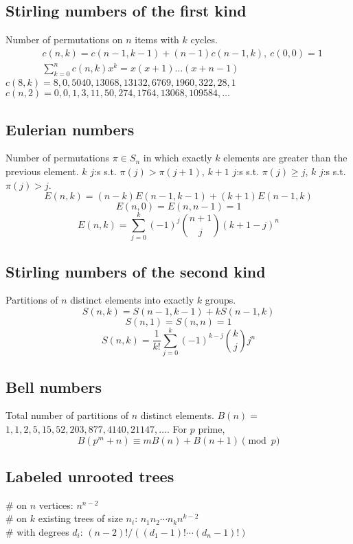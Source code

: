 \subsection{Stirling numbers of the first kind}
Number of permutations on $n$ items with $k$ cycles.
\begin{align*}
    & c(n,k) = c(n-1,k-1) + (n-1) c(n-1,k),\ c(0,0) = 1        \\
    & \textstyle \sum_{k=0}^n c(n,k)x^k = x(x+1) \dots (x+n-1)
\end{align*}
$c(8,k) = 8, 0, 5040, 13068, 13132, 6769, 1960, 322, 28, 1$ \\
$c(n,2) = 0, 0, 1, 3, 11, 50, 274, 1764, 13068, 109584, \dots$

\subsection{Eulerian numbers}
Number of permutations $\pi \in S_n$ in which exactly $k$ elements are greater
than the previous element. $k$ $j$:s s.t. $\pi(j)>\pi(j+1)$, $k+1$ $j$:s s.t.
$\pi(j)\geq j$, $k$ $j$:s s.t. $\pi(j)>j$. $$E(n,k) = (n-k)E(n-1,k-1) +
   (k+1)E(n-1,k)$$ $$E(n,0) = E(n,n-1) = 1$$ $$E(n,k) =
   \sum_{j=0}^k(-1)^j\binom{n+1}{j}(k+1-j)^n$$

\subsection{Stirling numbers of the second kind}
Partitions of $n$ distinct elements into exactly $k$ groups. $$S(n,k) =
   S(n-1,k-1) + k S(n-1,k)$$ $$S(n,1) = S(n,n) = 1$$ $$S(n,k) =
   \frac{1}{k!}\sum_{j=0}^k (-1)^{k-j}\binom{k}{j}j^n$$

\subsection{Bell numbers}
Total number of partitions of $n$ distinct elements. $B(n) =$ $1, 1, 2, 5, 15,
   52, 203, 877, 4140, 21147, \dots$. For $p$ prime,
\[ B(p^m+n)\equiv mB(n)+B(n+1) \pmod{p} \]

\subsection{Labeled unrooted trees}
\# on $n$ vertices: $n^{n-2}$ \\
\# on $k$ existing trees of size $n_i$: $n_1n_2\cdots n_k n^{k-2}$ \\
\# with degrees $d_i$: $(n-2)! / ((d_1-1)! \cdots (d_n-1)!)$


